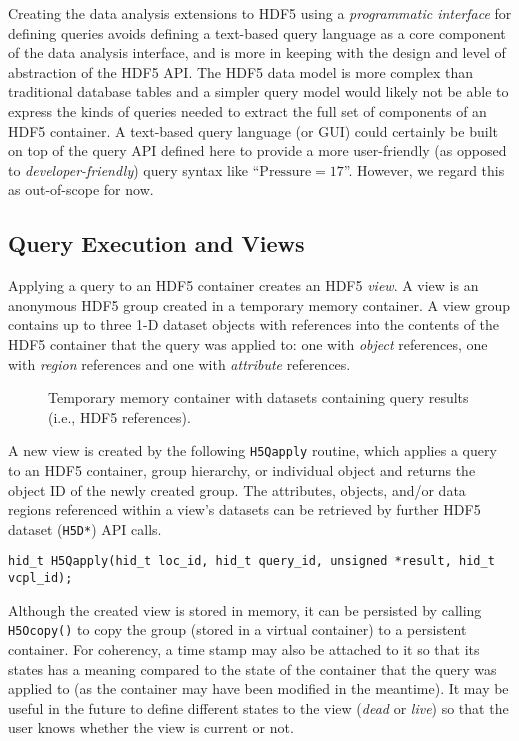 Creating the data analysis extensions to HDF5 using a \textit{programmatic
interface} for defining queries avoids defining a text-based query language
as a core component of the data analysis interface, and is more in keeping with
the design and level of abstraction of the HDF5 API.
The HDF5 data model is more complex than traditional database tables and a
simpler query model would likely not be able to express the kinds of queries
needed to extract the full set of components of an HDF5 container. A text-based
query language (or GUI) could certainly be built on top of the query API
defined here to provide a more user-friendly (as opposed to
\textit{developer-friendly}) query syntax like ``$\mathrm{Pressure = 17}$''.
However, we regard this as out-of-scope for now.

\subsection{Query Execution and Views}
Applying a query to an HDF5 container creates an HDF5 \textit{view}. A view is
an anonymous HDF5 group created in a temporary memory container. A view group contains up to
three 1-D dataset objects with references into the contents of the HDF5 container
that the query was applied to:
one with \textit{object} references, one with \textit{region} references and
one with \textit{attribute} references.

\begin{figure}

\caption{Temporary memory container with datasets containing query results (i.e.,
HDF5 references).}
\label{fig:hdf5_view}
\vspace{-20pt}
\end{figure}

A new view is created by the
following \texttt{H5Qapply} routine, which applies a query to an HDF5 container,
group hierarchy, or individual object and returns the object ID of the newly created
group. The attributes, objects, and/or data regions referenced within a view's
datasets can be retrieved by further HDF5 dataset (\texttt{H5D*}) API calls.

{
\begin{lstlisting}
hid_t H5Qapply(hid_t loc_id, hid_t query_id, unsigned *result, hid_t vcpl_id);
\end{lstlisting}
}

Although the created view is stored in memory, it can be persisted
by calling \texttt{H5Ocopy()} to copy the group (stored in a virtual
container) to a persistent container. For
coherency, a time stamp may also be attached to it so that its states has a meaning
compared to the state of the container that the query was applied to (as the
container may have been modified in the meantime). It may be useful in
the future to define different states to the view (\textit{dead} or
\textit{live}) so that the user knows whether the view is current or not.

